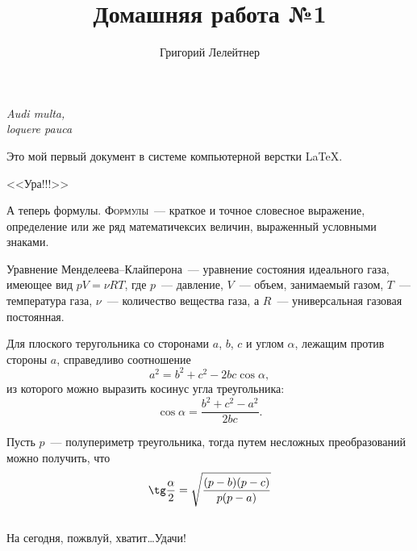 \documentclass[12pt]{article}
\title{Домашняя работа №1}
\author{Григорий Лелейтнер}
\date{}
\begin{document}
	\maketitle
    
    \begin{flushright}
    {\itshape
        Audi multa,\\
        loquere pauca
    }
    \end{flushright}
    \vspace{20pt}
    
    Это мой первый документ в системе компьютерной верстки \LaTeX.
    
    \begin{center}
        {\Huge \sffamily <<Ура!!!>> }
    \end{center}
    
    А теперь формулы. \textsc{Формулы}~--- краткое и точное словесное выражение, определение или же ряд математичексих величин, выраженный условными знаками.
    
    \vspace{15pt}
    \hspace{14pt}{\Large \bfseries Термодинамика}
    
    Уравнение Менделеева--Клайперона~--- уравнение состояния идеального газа, имеющее вид $pV = \nu RT$, где $p$~--- давление, $V$~--- объем, занимаемый газом, $T$~--- температура газа, $\nu$~--- количество вещества газа, а $R$~--- универсальная газовая постоянная.
    
    \vspace{15pt}
    \hspace{14pt}{\Large \bfseries Геометрия \hfill Планиметрия}
    
    Для плоского теругольника со сторонами $a$, $b$, $c$ и углом $\alpha$, лежащим против стороны $a$, справедливо соотношение
    $$a^2 = b^2 + c^2 - 2bc\cos\alpha,$$
    из которого можно выразить косинус угла треугольника:
    $$\cos\alpha = \frac{b^2 + c^2 - a^2}{2bc}.$$
    
    Пусть $p$~--- полупериметр треугольника, тогда путем несложных преобразований можно получить, что 
    $$\tg \frac{\alpha}{2} = \sqrt{\frac{(p-b)(p-c)}{p(p-a)}}$$\\
    \vspace{1cm}
    На сегодня, пожвлуй, хватит\dots Удачи!
    
\end{document}
